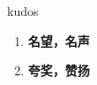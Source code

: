 
\begin{frame}
{\huge kudos}
\begin{center}
\begin{enumerate}\Large
  \item \textbf{名望，名声}
  \item \textbf{夸奖，赞扬}
\end{enumerate}
\end{center}
\end{frame}
